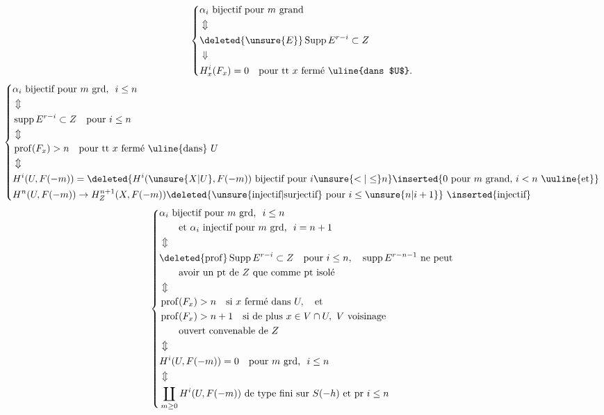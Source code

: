 \[
\left\{\begin{aligned}
&\alpha_i\text{ bijectif pour }m\text{ grand}\\
&\Updownarrow\\
&\deleted{\unsure{E}}\operatorname{Supp} E^{r-i}\subset Z\\
&\Downarrow\\
&H^i_x(F_x)=0\quad\text{pour tt }x\text{ fermé \uline{dans $U$}.}
\end{aligned}\right.
\]
\[
\left\{\begin{aligned}
&\alpha_i\text{ bijectif pour }m\text{ grd, }\ i\leq n\\
&\Updownarrow\\
&\operatorname{supp}E^{r-i}\subset Z\quad\text{pour }i\leq n\\
&\Updownarrow\\
&\operatorname{prof}(F_x)>n\quad\text{pour tt }x\text{ fermé \uline{dans} }U\\
&\Updownarrow\\
&H^i(U,F(-m))=\deleted{H^i(\unsure{X|U},F(-m))\ \text{bijectif pour }i\unsure{<|\leq}n}
\inserted{0\ \text{pour }m\text{ grand, }i<n\text{ \uuline{et}}}\\
&H^n(U,F(-m))\to H^{n+1}_Z(X,F(-m))
\deleted{\text{\unsure{injectif|surjectif} pour }i\leq\unsure{n|i+1}}\ \inserted{\text{injectif}}
\end{aligned}\right.
\]
\[
\left\{\begin{aligned}
&\alpha_i\text{ bijectif pour }m\text{ grd, }\ i\leq n\\
&\qquad\text{et }\alpha_i\text{ injectif pour }m\text{ grd, }\ i=n+1\\
&\Updownarrow\\
&\deleted{\operatorname{prof}}\operatorname{Supp} E^{r-i}\subset Z\quad\text{pour }i\leq n,\quad
\operatorname{supp} E^{r-n-1}\text{ ne peut}\\
&\qquad\text{avoir un pt de }Z\text{ que comme pt isolé}\\
&\Updownarrow\\
&\operatorname{prof}(F_x)>n\quad\text{si }x\text{ fermé dans }U,\quad\text{et}\\
&\operatorname{prof}(F_x)>n+1\quad\text{si de plus }x\in V\cap U,\ V\text{ voisinage}\\
&\qquad\text{ouvert convenable de }Z\\
&\Updownarrow\\
&H^i(U,F(-m))=0\quad\text{pour }m\text{ grd, }\ i\leq n\\
&\Updownarrow\\
&\coprod_{m\geq0} H^i(U,F(-m))\ \text{de type fini sur }S(-h)\ \text{et pr }i\leq n
\end{aligned}\right.
\]
